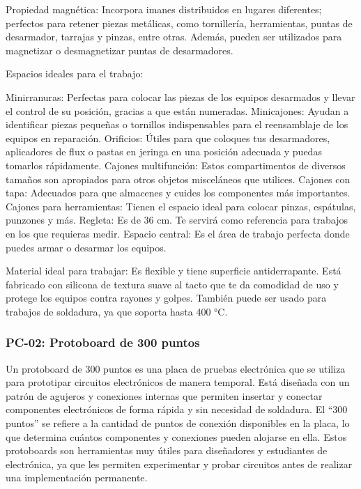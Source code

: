     
    Propiedad magnética: Incorpora imanes distribuidos en lugares diferentes; perfectos para retener piezas metálicas, como tornillería, herramientas, puntas de desarmador, tarrajas y pinzas, entre otras. Además, pueden ser utilizados para magnetizar o desmagnetizar puntas de desarmadores.
    
    
    Espacios ideales para el trabajo:
    
    Minirranuras: Perfectas para colocar las piezas de los equipos desarmados y llevar el control de su posición, gracias a que están numeradas.
    Minicajones: Ayudan a identificar piezas pequeñas o tornillos indispensables para el reensamblaje de los equipos en reparación.
    Orificios: Útiles para que coloques tus desarmadores, aplicadores de flux o pastas en jeringa en una posición adecuada y puedas tomarlos rápidamente.
    Cajones multifunción: Estos compartimentos de diversos tamaños son apropiados para otros objetos misceláneos que utilices.
    Cajones con tapa: Adecuados para que almacenes y cuides los componentes más importantes.
    Cajones para herramientas: Tienen el espacio ideal para colocar pinzas, espátulas, punzones y más.
    Regleta: Es de 36 cm. Te servirá como referencia para trabajos en los que requieras medir.
    Espacio central: Es el área de trabajo perfecta donde puedes armar o desarmar los equipos.
    
    Material ideal para trabajar: Es flexible y tiene superficie antiderrapante. Está fabricado con silicona de textura suave al tacto que te da comodidad de uso y protege los equipos contra rayones y golpes. También puede ser usado para trabajos de soldadura, ya que soporta hasta 400 °C.
    
    
    
    \subsubsection{PC-02: Protoboard de 300 puntos}
    
    Un protoboard de 300 puntos es una placa de pruebas electrónica que se utiliza para prototipar circuitos electrónicos de manera temporal. Está diseñada con un patrón de agujeros y conexiones internas que permiten insertar y conectar componentes electrónicos de forma rápida y sin necesidad de soldadura. El “300 puntos” se refiere a la cantidad de puntos de conexión disponibles en la placa, lo que determina cuántos componentes y conexiones pueden alojarse en ella. Estos protoboards son herramientas muy útiles para diseñadores y estudiantes de electrónica, ya que les permiten experimentar y probar circuitos antes de realizar una implementación permanente.
    
